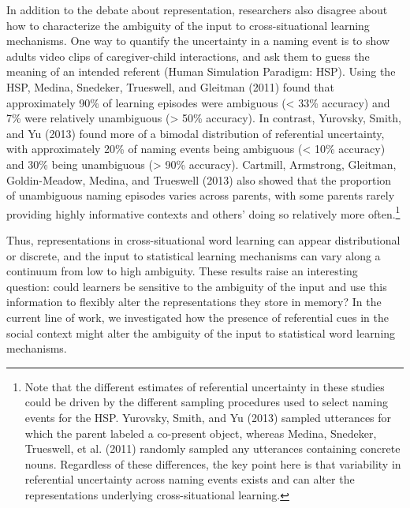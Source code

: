 \documentclass[authoryear, review]{elsarticle}
\begin{document}
In addition to the debate about representation, researchers also
disagree about how to characterize the ambiguity of the input to
cross-situational learning mechanisms. One way to quantify the
uncertainty in a naming event is to show adults video clips of
caregiver-child interactions, and ask them to guess the meaning of an
intended referent (Human Simulation Paradigm: HSP). Using the HSP,
Medina, Snedeker, Trueswell, and Gleitman (2011) found that
approximately 90\% of learning episodes were ambiguous (\textless{} 33\%
accuracy) and 7\% were relatively unambiguous (\textgreater{} 50\%
accuracy). In contrast, Yurovsky, Smith, and Yu (2013) found more of a
bimodal distribution of referential uncertainty, with approximately 20\%
of naming events being ambiguous (\textless{} 10\% accuracy) and 30\%
being unambiguous (\textgreater{} 90\% accuracy). Cartmill, Armstrong,
Gleitman, Goldin-Meadow, Medina, and Trueswell (2013) also showed that
the proportion of unambiguous naming episodes varies across parents,
with some parents rarely providing highly informative contexts and
others' doing so relatively more often.\footnote{Note that the different
  estimates of referential uncertainty in these studies could be driven
  by the different sampling procedures used to select naming events for
  the HSP. Yurovsky, Smith, and Yu (2013) sampled utterances for which
  the parent labeled a co-present object, whereas Medina, Snedeker,
  Trueswell, et al. (2011) randomly sampled any utterances containing
  concrete nouns. Regardless of these differences, the key point here is
  that variability in referential uncertainty across naming events
  exists and can alter the representations underlying cross-situational
  learning.}

Thus, representations in cross-situational word learning can appear
distributional or discrete, and the input to statistical learning
mechanisms can vary along a continuum from low to high ambiguity. These
results raise an interesting question: could learners be sensitive to
the ambiguity of the input and use this information to flexibly alter
the representations they store in memory? In the current line of work,
we investigated how the presence of referential cues in the social
context might alter the ambiguity of the input to statistical word
learning mechanisms.
\end{document}
